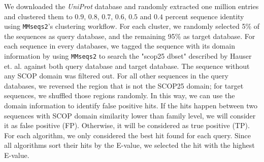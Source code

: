 We downloaded the \textit{UniProt} database and randomly extracted one million entries and clustered them to $0.9$, $0.8$, $0.7$, $0.6$, $0.5$ and $0.4$ percent sequence identity using \texttt{MMseqs2}'s clustering workflow.
For each cluster, we randomly selected 5\% of the sequences as query database, and the remaining 95\% as target database.
For each sequence in every databases, we tagged the sequence with its domain information by using \texttt{MMseqs2} to search the "scop25 dbset" described by Hauser et.
al.
\cite{hauser_mmseqs_2016} against both query database and target database.
The sequence without any SCOP domain was filtered out.
For all other sequences in the query databases, we reversed the region that is not the SCOP25 domain; for target sequences, we shuffled those regions randomly.
In this way, we can use the domain information to identify false positive hits.
If the hits happen between two sequences with SCOP domain similarity lower than family level, we will consider it as false positive (FP).
Otherwise, it will be considered as true positive (TP).
For each algorithm, we only considered the best hit found for each query.
Since all algorithms
sort their hits by the E-value, we selected the hit with the highest E-value.
